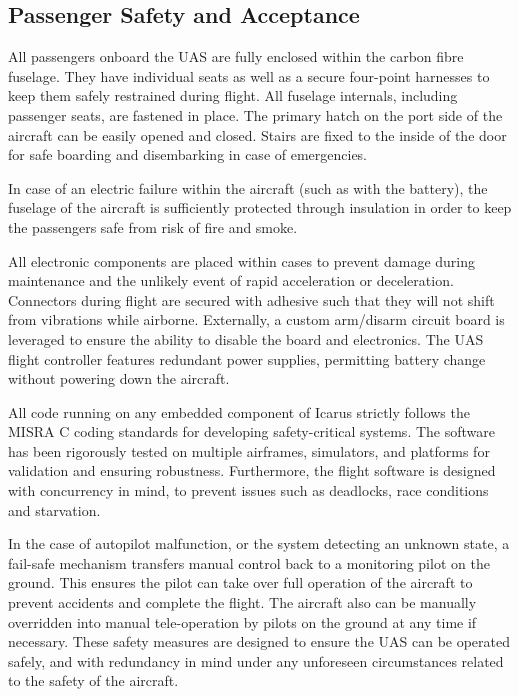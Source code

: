 \clearpage

\subsection{Passenger Safety and Acceptance}
\label{sec:safety}

All passengers onboard the UAS are fully enclosed within the carbon fibre
fuselage. They have individual seats as well as a secure four-point harnesses
to keep them safely restrained during flight. All fuselage internals, including
passenger seats, are fastened in place. The primary hatch on the port side of
the aircraft can be easily opened and closed. Stairs are fixed to the inside of
the door for safe boarding and disembarking in case of emergencies.

In case of an electric failure within the aircraft (such as with the battery),
the fuselage of the aircraft is sufficiently protected through insulation in
order to keep the passengers safe from risk of fire and smoke.

All electronic components are placed within cases to prevent damage during
maintenance and the unlikely event of rapid acceleration or deceleration.
Connectors during flight are secured with adhesive such that they will not
shift from vibrations while airborne. Externally, a custom arm/disarm circuit
board is leveraged to ensure the ability to disable the board and electronics.
The UAS flight controller features redundant power supplies, permitting
battery change without powering down the aircraft.

All code running on any embedded component of Icarus strictly follows the MISRA
C coding standards for developing safety-critical systems. The software has
been rigorously tested on multiple airframes, simulators, and platforms for
validation and ensuring robustness. Furthermore, the flight software is
designed with concurrency in mind, to prevent issues such as deadlocks, race
conditions and starvation.

In the case of autopilot malfunction, or the system detecting an unknown state,
a fail-safe mechanism transfers manual control back to a monitoring pilot on
the ground. This ensures the pilot can take over full operation of the aircraft
to prevent accidents and complete the flight. The aircraft also can be manually
overridden into manual tele-operation by pilots on the ground at any time if
necessary. These safety measures are designed to ensure the UAS can be operated
safely, and with redundancy in mind under any unforeseen circumstances related
to the safety of the aircraft.
